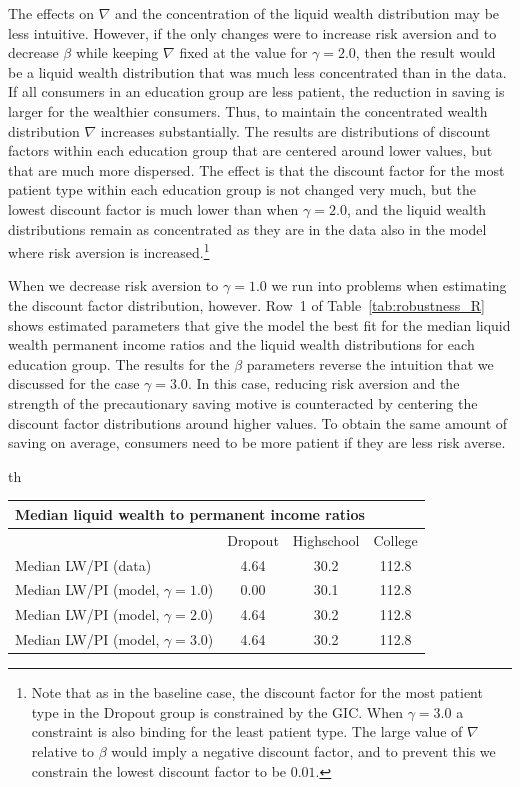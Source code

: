 \documentclass[../HAFiscal]{subfiles}
\begin{document}
The effects on $\nabla$ and the concentration of the liquid wealth distribution may be less intuitive. However, if the only changes were to increase risk aversion and to decrease $\beta$ while keeping $\nabla$ fixed at the value for $\gamma=2.0$, then the result would be a liquid wealth distribution that was much less concentrated than in the data. If all consumers in an education group are less patient, the reduction in saving is larger for the wealthier consumers. Thus, to maintain the concentrated wealth distribution $\nabla$ increases substantially. The results are distributions of discount factors within each education group that are centered around lower values, but that are much more dispersed. The effect is that the discount factor for the most patient type within each education group is not changed very much, but the lowest discount factor is much lower than when $\gamma=2.0$, and the liquid wealth distributions remain as concentrated as they are in the data also in the model where risk aversion is increased.\footnote{Note that as in the baseline case, the discount factor for the most patient type in the Dropout group is constrained by the GIC. When $\gamma=3.0$ a constraint is also binding for the least patient type. The large value of $\nabla$ relative to $\beta$ would imply a negative discount factor, and to prevent this we constrain the lowest discount factor to be $0.01$.}

When we decrease risk aversion to $\gamma=1.0$ we run into problems when estimating the discount factor distribution, however. Row~1 of Table~\ref{tab:robustness_R} shows estimated parameters that give the model the best fit for the median liquid wealth permanent income ratios and the liquid wealth distributions for each education group. The results for the $\beta$ parameters reverse the intuition that we discussed for the case $\gamma=3.0$. In this case, reducing risk aversion and the strength of the precautionary saving motive is counteracted by centering the discount factor distributions around higher values. To obtain the same amount of saving on average, consumers need to be more patient if they are less risk averse.  

\begin{table}{th}
\begin{center}
\begin{tabular}{lccc}
	\multicolumn{4}{l}{Median liquid wealth to permanent income ratios} \\ \midrule
	& Dropout & Highschool & College \\ \midrule
	Median LW/PI (data) & 4.64 & 30.2 & 112.8 \\ 
	Median LW/PI (model, $\gamma = 1.0$) & 0.00 & 30.1 & 112.8 \\	
	Median LW/PI (model, $\gamma = 2.0$) & 4.64 & 30.2 & 112.8 \\
	Median LW/PI (model, $\gamma = 3.0$) & 4.64 & 30.2 & 112.8 \\ \bottomrule
\end{tabular}
\end{center}	
\end{table}
\end{document}
